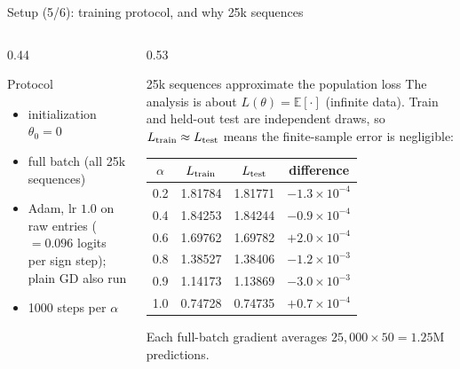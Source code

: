 \documentclass[aspectratio=169,11pt]{beamer}
\newcommand{\1}{\mathbf{1}}
\begin{document}
\begin{frame}{Setup (5/6): training protocol, and why 25k sequences}
\footnotesize
\begin{columns}[T]
\begin{column}{0.44\textwidth}
\begin{block}{Protocol}
\begin{itemize}
\item initialization $\theta_0=0$
\item full batch (all 25k sequences)
\item Adam, lr $1.0$ on raw entries ($=0.096$ logits per sign step); plain GD also run
\item 1000 steps per $\alpha$
\end{itemize}
\end{block}
\end{column}
\begin{column}{0.53\textwidth}
\begin{block}{25k sequences approximate the population loss}
The analysis is about $L(\theta)=\mathbb E[\cdot]$ (infinite data). Train and held-out test are independent draws, so
$L_{\rm train}\approx L_{\rm test}$ means the finite-sample error is negligible:
\begin{center}
\begin{tabular}{cccc}\toprule
$\alpha$ & $L_{\rm train}$ & $L_{\rm test}$ & difference\\\midrule
0.2 & 1.81784 & 1.81771 & $-1.3\times10^{-4}$\\
0.4 & 1.84253 & 1.84244 & $-0.9\times10^{-4}$\\
0.6 & 1.69762 & 1.69782 & $+2.0\times10^{-4}$\\
0.8 & 1.38527 & 1.38406 & $-1.2\times10^{-3}$\\
0.9 & 1.14173 & 1.13869 & $-3.0\times10^{-3}$\\
1.0 & 0.74728 & 0.74735 & $+0.7\times10^{-4}$\\\bottomrule
\end{tabular}
\end{center}
Each full-batch gradient averages $25{,}000\times50=1.25$M predictions.
\end{block}
\end{column}
\end{columns}
\end{frame}
\end{document}
